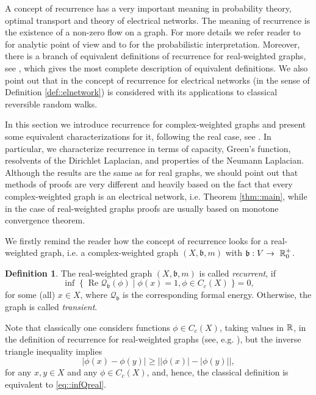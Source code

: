 \documentclass[a4paper,11pt]{amsart}
\theoremstyle{definition}
\newtheorem{definition}[theorem]{Definition}
\renewcommand{\Re}{\operatorname{Re}}%
\newcommand{\Q}{\mathcal{Q}}
\begin{document}
A concept of recurrence has a very important meaning in probability theory, optimal transport and theory of electrical networks.   The meaning of recurrence is the existence of a non-zero flow on a graph. For more details we refer reader to \cite[Chapter 6]{KellerLenzWojcBook} for analytic point of view and to \cite{Woess09, Woess00} for the probabilistic interpretation. Moreover, there is a branch of equivalent definitions of recurrence for real-weighted graphs, see \cite[Theorem 6.1]{KellerLenzWojcBook}, which gives the most complete description of equivalent definitions.
 We also point out that in \cite{MuranovaWoess} the concept of recurrence for electrical networks (in the sense of Definition \ref{def::elnetwork}) is considered with its applications to classical reversible random walks. 
 
 In this section we introduce recurrence for complex-weighted graphs and present some equivalent characterizations for it, following the real case, see \cite[Theorem 6.1]{KellerLenzWojcBook}. In particular, we characterize recurrence in terms of capacity, Green's function, resolvents of the Dirichlet Laplacian, and properties of the Neumann Laplacian. Although the results are the same as for real graphs, we should point out that methods of proofs are very different and heavily based on the fact that every complex-weighted graph is an electrical network, i.e. Theorem \ref{thm::main}, while in the case of real-weighted graphs proofs are usually based on monotone convergence theorem.


 We firstly remind the reader how the concept of recurrence looks for a real-weighted graph, i.e. a complex-weighted graph $(X,\mathfrak b,m)$ with $\mathfrak b: V\to~\Bbb R^+_0$. 
\begin{definition}\label{def::classicalRec}
The real-weighted graph $(X, \mathfrak b, m)$  is called {\em recurrent}, if
\begin{equation}\label{eq::infQreal}
\inf \;\{\;\Re \Q_\mathfrak b(\phi)\;|\;\phi(x)=1, \phi\in C_c(X)\;\}=0,
\end{equation}
for some (all) $x\in X$, where $\Q_\mathfrak b$ is the corresponding formal energy.
 Otherwise, the graph is called {\em transient}. 
 \end{definition}
 Note that classically one considers  functions $\phi\in C_c(X)$, taking values in $\Bbb R$, in the definition of recurrence for real-weighted graphs (see, e.g. \cite[Theorem 6.1(vii), Definition 6.2]{KellerLenzWojcBook}), but  the inverse triangle inequality implies
$$
\big|\phi(x)-\phi(y)\big|\ge \big||\phi(x)|-|\phi(y)|\big|,
$$
for any $x,y\in X$ and any $\phi\in C_c(X)$, and, hence, the classical definition is equivalent to \eqref{eq::infQreal}.
\end{document}
